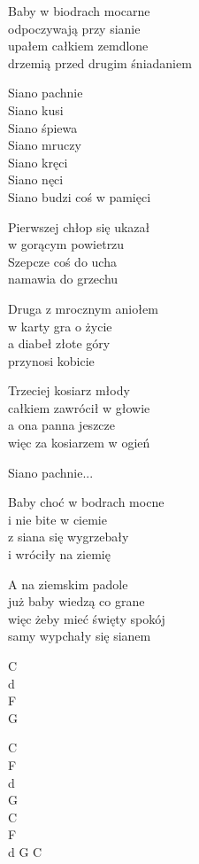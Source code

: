 \begin{text}
    Baby w biodrach mocarne\\
    odpoczywają przy sianie\\
    upałem całkiem zemdlone\\
    drzemią przed drugim śniadaniem

    \vin Siano pachnie\\
    \vin Siano kusi\\
    \vin Siano śpiewa\\
    \vin Siano mruczy\\
    \vin Siano kręci\\
    \vin Siano nęci\\
    \vin Siano budzi coś w pamięci

    Pierwszej chłop się ukazał\\
    w gorącym powietrzu\\
    Szepcze coś do ucha\\
    namawia do grzechu

    Druga z mrocznym aniołem\\
    w karty gra o życie\\
    a diabeł złote góry\\
    przynosi kobicie

    Trzeciej kosiarz młody\\
    całkiem zawrócił w głowie\\
    a ona panna jeszcze\\
    więc za kosiarzem w ogień

    \vin Siano pachnie...

    Baby choć w bodrach mocne\\
    i nie bite w ciemie\\
    z siana się wygrzebały\\
    i wróciły na ziemię

    A na ziemskim padole\\
    już baby wiedzą co grane\\
    więc żeby mieć święty spokój\\
    samy wypchały się sianem
\end{text}
\begin{chord}
    C\\
    d\\
    F\\
    G

    C\\
    F\\
    d\\
    G\\
    C\\
    F\\
    d G C
\end{chord}